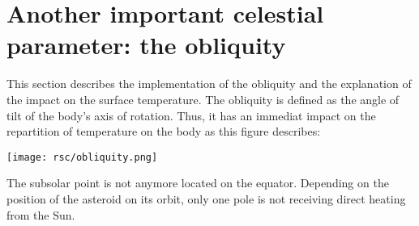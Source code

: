 \section{Another important celestial parameter: the obliquity}
\label{obliquity}

This section describes the implementation of the obliquity and the explanation of the impact on the surface temperature. The obliquity is defined as the angle of tilt of the body's axis of rotation. Thus, it has an immediat impact on the repartition of temperature on the body as this figure describes: 
\begin{center}
    \texttt{[image: rsc/obliquity.png]}
\end{center}
The subsolar point is not anymore located on the equator. Depending on the position of the asteroid on its orbit, only one pole is not receiving direct heating from the Sun.
